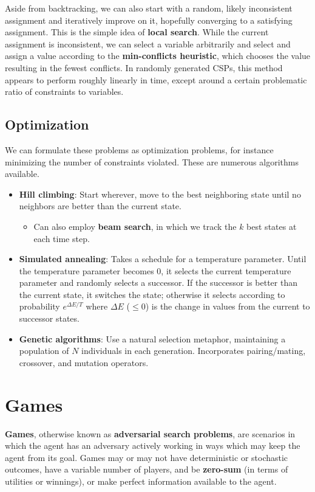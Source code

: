 \documentclass[12pt]{article}
\begin{document}
Aside from backtracking, we can also start with a random, likely inconsistent assignment and iteratively improve on it, hopefully converging to a satisfying assignment. This is the simple idea of \textbf{local search}. While the current assignment is inconsistent, we can select a variable arbitrarily and select and assign a value according to the \textbf{min-conflicts heuristic}, which chooses the value resulting in the fewest conflicts. In randomly generated CSPs, this method appears to perform roughly linearly in time, except around a certain problematic ratio of constraints to variables.

\subsection{Optimization}

We can formulate these problems as optimization problems, for instance minimizing the number of constraints violated. These are numerous algorithms available.
\begin{itemize}
\item \textbf{Hill climbing}: Start wherever, move to the best neighboring state until no neighbors are better than the current state.
\begin{itemize}
\item Can also employ \textbf{beam search}, in which we track the $k$ best states at each time step.
\end{itemize}
\item \textbf{Simulated annealing}: Takes a schedule for a temperature parameter. Until the temperature parameter becomes $0$, it selects the current temperature parameter and randomly selects a successor. If the successor is better than the current state, it switches the state; otherwise it selects according to probability $e^{\Delta E/T}$ where $\Delta E$ ($\leq 0$) is the change in values from the current to successor states.
\item \textbf{Genetic algorithms}: Use a natural selection metaphor, maintaining a population of $N$ individuals in each generation. Incorporates pairing/mating, crossover, and mutation operators.
\end{itemize}

\section{Games}

\textbf{Games}, otherwise known as \textbf{adversarial search problems}, are scenarios in which the agent has an adversary actively working in ways which may keep the agent from its goal. Games may or may not have deterministic or stochastic outcomes, have a variable number of players, and be \textbf{zero-sum} (in terms of utilities or winnings), or make perfect information available to the agent.
\end{document}
